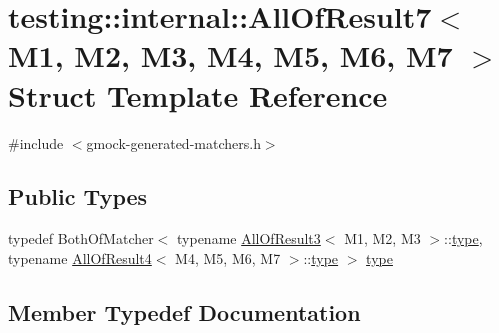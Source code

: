 \hypertarget{structtesting_1_1internal_1_1AllOfResult7}{}\section{testing\+::internal\+::All\+Of\+Result7$<$ M1, M2, M3, M4, M5, M6, M7 $>$ Struct Template Reference}
\label{structtesting_1_1internal_1_1AllOfResult7}


{\ttfamily \#include $<$gmock-\/generated-\/matchers.\+h$>$}

\subsection*{Public Types}
\begin{DoxyCompactItemize}
\item 
typedef Both\+Of\+Matcher$<$ typename \mbox{\hyperlink{structtesting_1_1internal_1_1AllOfResult3}{All\+Of\+Result3}}$<$ M1, M2, M3 $>$\+::\mbox{\hyperlink{structtesting_1_1internal_1_1AllOfResult7_a47ab0d670258434b0e65530591948e8c}{type}}, typename \mbox{\hyperlink{structtesting_1_1internal_1_1AllOfResult4}{All\+Of\+Result4}}$<$ M4, M5, M6, M7 $>$\+::\mbox{\hyperlink{structtesting_1_1internal_1_1AllOfResult7_a47ab0d670258434b0e65530591948e8c}{type}} $>$ \mbox{\hyperlink{structtesting_1_1internal_1_1AllOfResult7_a47ab0d670258434b0e65530591948e8c}{type}}
\end{DoxyCompactItemize}


\subsection{Member Typedef Documentation}
\mbox{\label{structtesting_1_1internal_1_1AllOfResult7_a47ab0d670258434b0e65530591948e8c}} 
